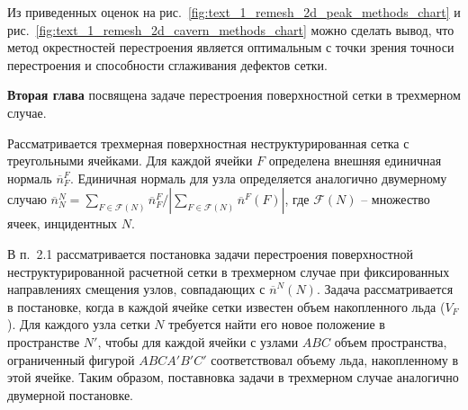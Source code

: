 \documentclass[a4paper,14pt]{extarticle}                     %
\theoremstyle{plain}                                         %
\begin{document}
Из приведенных оценок на рис.~\ref{fig:text_1_remesh_2d_peak_methods_chart} и рис.~\ref{fig:text_1_remesh_2d_cavern_methods_chart} можно сделать вывод, что метод окрестностей перестроения является оптимальным с точки зрения точноси перестроения и способности сглаживания дефектов сетки.


\newpage
\textbf{Вторая глава} посвящена задаче перестроения поверхностной сетки в трехмерном случае.

Рассматривается трехмерная поверхностная неструктурированная сетка с треугольными ячейками.
Для каждой ячейки $F$ определена внешняя единичная нормаль $\overline{n}_F^F$.
Единичная нормаль для узла определяется аналогично двумерному случаю $\overline{n}_N^N = \sum_{F \in \mathscr{F}(N)}{\overline{n}_F^F} / |\sum_{F \in \mathscr{F}(N)}{\overline{n}^F(F)}|$, где $\mathscr{F}(N)$ -- множество ячеек, инцидентных $N$.


В п.~2.1 рассматривается постановка задачи перестроения поверхностной неструктурированной расчетной сетки в трехмерном случае при фиксированных направлениях смещения узлов, совпадающих с $\overline{n}^N(N)$.
Задача рассматривается в постановке, когда в каждой ячейке сетки известен объем накопленного льда ($V_F$).
Для каждого узла сетки $N$ требуется найти его новое положение в пространстве $N'$, чтобы для каждой ячейки с узлами $ABC$ объем пространства, ограниченный фигурой $ABCA'B'C'$ соответствовал объему льда, накопленному в этой ячейке.
Таким образом, поставновка задачи в трехмерном случае аналогично двумерной постановке.
\end{document}
